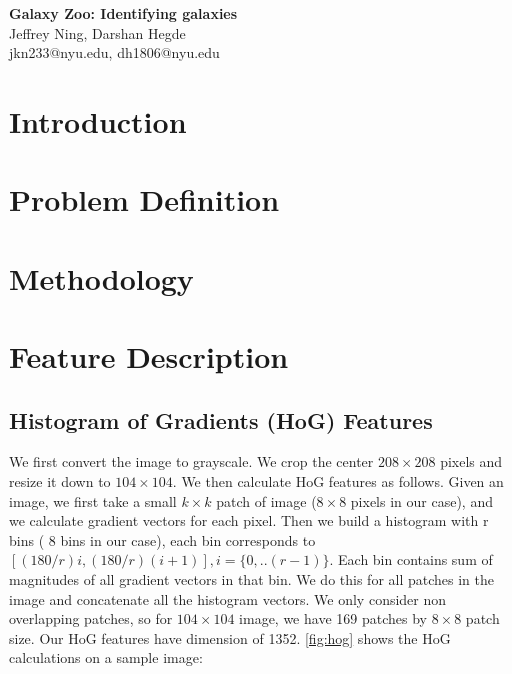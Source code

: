 \documentclass[10pt]{article}
\date{05/16/2014}
\begin{document}
\begin{flushleft}
{\Large
\textbf{Galaxy Zoo: Identifying galaxies}
}
\\
Jeffrey Ning, 
Darshan Hegde 
\\
jkn233@nyu.edu, dh1806@nyu.edu
\end{flushleft}

\section*{Introduction}



\section*{Problem Definition}

\section*{Methodology}

\section*{Feature Description}

\subsection*{Histogram of Gradients (HoG) Features}
We first convert the image to grayscale. We crop the center $ 208 \times 208 $ pixels and resize it down to $104 \times 104$. We then calculate HoG features as follows. Given an image, we first take a small $k \times k$ patch of image ($8 \times 8$ pixels in our case), and we calculate gradient vectors for each pixel. Then we build a histogram with r bins ( 8 bins in our case), each bin corresponds to ${[(180/r)i, (180/r)(i+1)]} , i=\{0, .. (r-1)\}$. Each bin contains sum of magnitudes of all gradient vectors in that bin. We do this for all patches in the image and concatenate all the histogram vectors. We only consider non overlapping patches, so for $104 \times 104$ image, we have 169 patches by $8 \times 8$ patch size. Our HoG features have dimension of 1352. \ref{fig:hog} shows the HoG calculations on a sample image: 
\end{document}
